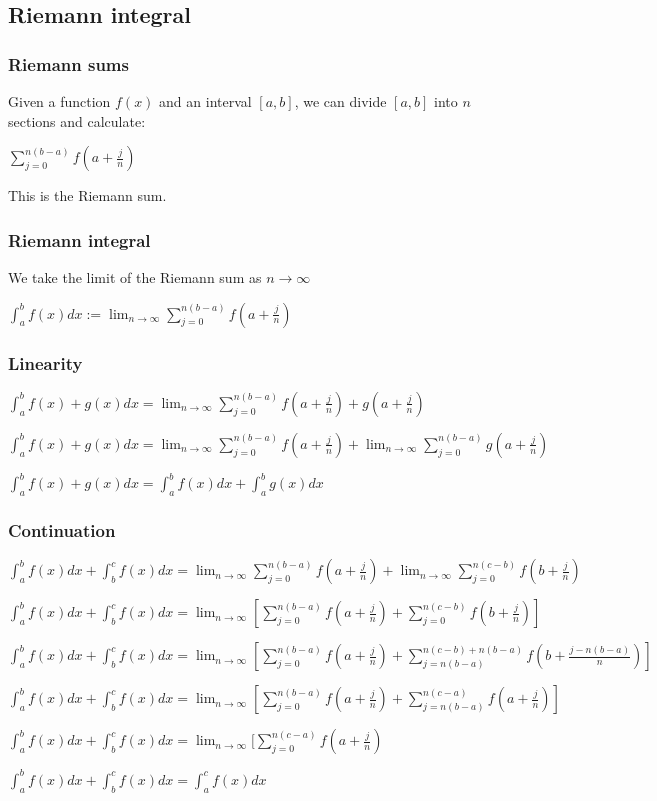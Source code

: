 
\subsection{Riemann integral}

\subsubsection{Riemann sums}

Given a function \(f(x)\) and an interval \([a,b]\), we can divide \([a,b]\) into \(n\) sections and calculate:

$\sum_{j=0}^{n(b-a)}f(a+\frac{j}{n})$

This is the Riemann sum.

\subsubsection{Riemann integral}

We take the limit of the Riemann sum as \(n\rightarrow \infty\)

\(\int_a^b f(x)dx:= \lim_{n\rightarrow \infty } \sum_{j=0}^{n(b-a)} f(a+ \frac{j}{n} )\)

\subsubsection{Linearity}

$\int_a^bf(x)+g(x)dx=\lim_{n\rightarrow \infty }\sum_{j=0}^{n(b-a)}f(a+\frac{j}{n})+g(a+\frac{j}{n})$

$\int_a^bf(x)+g(x)dx=\lim_{n\rightarrow \infty }\sum_{j=0}^{n(b-a)}f(a+\frac{j}{n})+\lim_{n\rightarrow \infty }\sum_{j=0}^{n(b-a)}g(a+\frac{j}{n})$

$\int_a^bf(x)+g(x)dx=\int_a^bf(x)dx +\int_a^bg(x)dx$

\subsubsection{Continuation}

$\int_a^bf(x)dx+\int_b^cf(x)dx=\lim_{n\rightarrow \infty }\sum_{j=0}^{n(b-a)}f(a+\frac{j}{n})+\lim_{n\rightarrow \infty }\sum_{j=0}^{n(c-b)}f(b+\frac{j}{n})$

$\int_a^bf(x)dx+\int_b^cf(x)dx=\lim_{n\rightarrow \infty }[\sum_{j=0}^{n(b-a)}f(a+\frac{j}{n})+\sum_{j=0}^{n(c-b)}f(b+\frac{j}{n})]$

$\int_a^bf(x)dx+\int_b^cf(x)dx=\lim_{n\rightarrow \infty }[\sum_{j=0}^{n(b-a)}f(a+\frac{j}{n})+\sum_{j=n(b-a)}^{n(c-b)+n(b-a)}f(b+\frac{j-n(b-a)}{n})]$

$\int_a^bf(x)dx+\int_b^cf(x)dx=\lim_{n\rightarrow \infty }[\sum_{j=0}^{n(b-a)}f(a+\frac{j}{n})+\sum_{j=n(b-a)}^{n(c-a)}f(a+\frac{j}{n})]$

$\int_a^bf(x)dx+\int_b^cf(x)dx=\lim_{n\rightarrow \infty }[\sum_{j=0}^{n(c-a)}f(a+\frac{j}{n})$

$\int_a^bf(x)dx+\int_b^cf(x)dx=\int_a^cf(x)dx$

